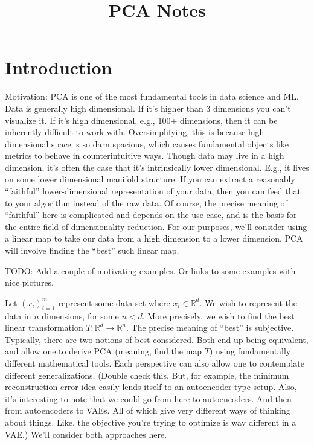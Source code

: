 \documentclass{book}
\title{PCA Notes}
\author{}
\date{}
\newcommand{\R}{\mathbb{R}}
\begin{document}
\maketitle


\section{Introduction}
Motivation: PCA is one of the most fundamental tools in data science and ML. Data is generally high dimensional. If it's higher than 3 dimensions you can't visualize it. If it's high dimensional, e.g., 100+ dimensions, then it can be inherently difficult to work with. Oversimplifying, this is because high dimensional space is so darn spacious, which causes fundamental objects like metrics to behave in counterintuitive ways. Though data may live in a high dimension, it's often the case that it's intrinsically lower dimensional. E.g., it lives on some lower dimensional manifold structure. If you can extract a reasonably ``faithful'' lower-dimensional representation of your data, then you can feed that to your algorithm instead of the raw data. Of course, the precise meaning of ``faithful'' here is complicated and depends on the use case, and is the basis for the entire field of dimensionality reduction. For our purposes, we'll consider using a linear map to take our data from a high dimension to a lower dimension. PCA will involve finding the ``best'' such linear map. 

TODO: Add a couple of motivating examples. Or links to some examples with nice pictures. 

Let $(x_i)_{i=1}^m$ represent some data set where $x_i \in \R^d$. We wish to represent the data in $n$ dimensions, for some $n<d$. More precisely, we wish to find the best linear transformation $T:\R^d\to\R^n$. The precise meaning of ``best'' is subjective. Typically, there are two notions of best considered. Both end up being equivalent, and allow one to derive PCA (meaning, find the map $T$) using fundamentally different mathematical tools. Each perspective can also allow one to contemplate different generalizations. (Double check this. But, for example, the minimum reconstruction error idea easily lends itself to an autoencoder type setup. Also, it's interesting to note that we could go from here to autoencoders. And then from autoencoders to VAEs. All of which give very different ways of thinking about things. Like, the objective you're trying to optimize is way different in a VAE.) We'll consider both approaches here. 
\end{document}
